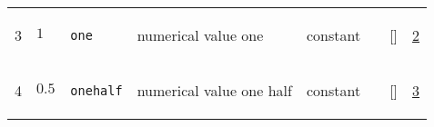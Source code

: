 \begin{longtable}{|p{1cm}|p{3cm}|p{3cm}|p{7cm}|p{3.0cm}|p{3cm}|p{2cm}|p{1cm}|}
                 \\
    3
             & \hypertarget{"v:3"}{ $ {1}{_{}} $}
             & \verb|one|
             & numerical value one
             & \begin{lay}constant \end{lay}
             & $  $
             & []
             & \hyperlink{"e:2"}{ 2 }
                 \\
    4
             & \hypertarget{"v:4"}{ $ {0.5}{_{}} $}
             & \verb|onehalf|
             & numerical value one half
             & \begin{lay}constant \end{lay}
             & $  $
             & []
             & \hyperlink{"e:3"}{ 3 }
                 \\
    \end{longtable}